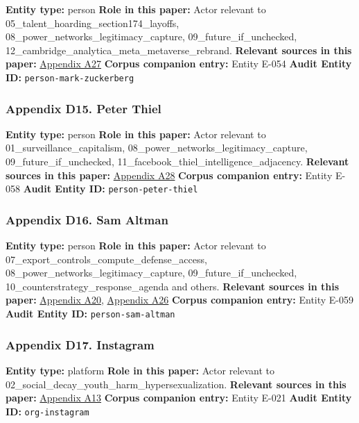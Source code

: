 \documentclass[
  american,
  11pt,
  letterpaper,
]{article}
\begin{document}
\textbf{Entity type:} person \textbf{Role in this paper:} Actor relevant
to 05\_talent\_hoarding\_section174\_layoffs,
08\_power\_networks\_legitimacy\_capture, 09\_future\_if\_unchecked,
12\_cambridge\_analytica\_meta\_metaverse\_rebrand. \textbf{Relevant
sources in this paper:}
\hyperref[appendix-a27-inside-mark-zuckerbergs-top-secret-hawaii-compound]{Appendix
A27} \textbf{Corpus companion entry:} Entity E-054 \textbf{Audit Entity
ID:} \texttt{person-mark-zuckerberg}

\subsubsection{Appendix D15. Peter
Thiel}\label{appendix-d15-peter-thiel}

\textbf{Entity type:} person \textbf{Role in this paper:} Actor relevant
to 01\_surveillance\_capitalism,
08\_power\_networks\_legitimacy\_capture, 09\_future\_if\_unchecked,
11\_facebook\_thiel\_intelligence\_adjacency. \textbf{Relevant sources
in this paper:}
\hyperref[appendix-a28-new-zealand-woos-the-wealthy-with-golden-visa-changes]{Appendix
A28} \textbf{Corpus companion entry:} Entity E-058 \textbf{Audit Entity
ID:} \texttt{person-peter-thiel}

\subsubsection{Appendix D16. Sam Altman}\label{appendix-d16-sam-altman}

\textbf{Entity type:} person \textbf{Role in this paper:} Actor relevant
to 07\_export\_controls\_compute\_defense\_access,
08\_power\_networks\_legitimacy\_capture, 09\_future\_if\_unchecked,
10\_counterstrategy\_response\_agenda and others. \textbf{Relevant
sources in this paper:}
\hyperref[appendix-a20-openais-proposals-for-the-us-ai-action-plan]{Appendix
A20}, \hyperref[appendix-a26-sam-altman-s-manifest-destiny]{Appendix
A26} \textbf{Corpus companion entry:} Entity E-059 \textbf{Audit Entity
ID:} \texttt{person-sam-altman}

\subsubsection{Appendix D17. Instagram}\label{appendix-d17-instagram}

\textbf{Entity type:} platform \textbf{Role in this paper:} Actor
relevant to 02\_social\_decay\_youth\_harm\_hypersexualization.
\textbf{Relevant sources in this paper:}
\hyperref[appendix-a13-unfiltered-how-teens-engage-in-body-image-and-shaming-discussions-via-instagram-direct-messages-dms]{Appendix
A13} \textbf{Corpus companion entry:} Entity E-021 \textbf{Audit Entity
ID:} \texttt{org-instagram}
\end{document}
